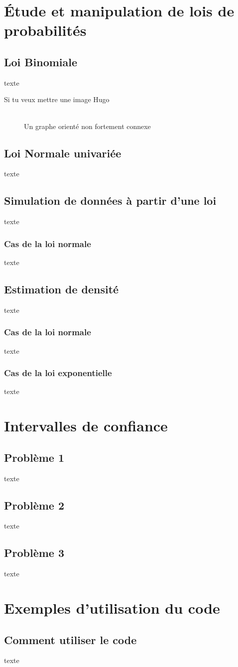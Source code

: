 \documentclass{article}      %
\begin{document}
\section{Étude et manipulation de lois de probabilités}
\subsection{Loi Binomiale}
texte

Si tu veux mettre une image Hugo
\begin{figure}[H]
    \centering
     \scalebox{.35}{  %
    }
    \\Un graphe orienté non fortement connexe
\end{figure}
\subsection{Loi Normale univariée}
texte
\subsection{Simulation de données à partir d’une loi}
texte

\subsubsection{Cas de la loi normale}
texte

\subsection{Estimation de densité}
texte

\subsubsection{Cas de la loi normale}
texte
\subsubsection{Cas de la loi exponentielle}
texte


\section{Intervalles de confiance}
\subsection{Problème 1}
texte
\subsection{Problème 2}
texte
\subsection{Problème 3}
texte



\section{Exemples d'utilisation du code}
\subsection{Comment utiliser le code}
texte
\end{document}
